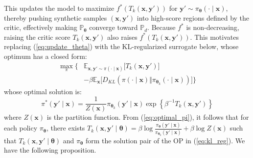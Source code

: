 This updates the model to maximize $f^{*}(T_{k}(\boldsymbol{x},\boldsymbol{y}'))$ for $\boldsymbol{y}' \sim \pi_{\boldsymbol{\theta}}(\cdot \mid \boldsymbol{x})$, thereby pushing synthetic samples $(\boldsymbol{x}, \boldsymbol{y}')$ into high-score regions defined by the critic, effectively making $\mathbb{P}_{\boldsymbol{\theta}}$ converge toward $\mathbb{P}_d$. Because $f^*$ is non-decreasing, raising the critic score $T_k(\boldsymbol{x},\boldsymbol{y}')$ also raises $f^*(T_k(\boldsymbol{x},\boldsymbol{y}'))$. This motivates replacing (\ref{eq:update_theta}) with the KL-regularized surrogate below, whose optimum has a closed form:
\begin{equation}
\label{eq:kl_reg}
\begin{split}
\max_{\pi} \bigg\{ & \mathbb{E}_{\boldsymbol{x},\boldsymbol{y}'\sim\pi(\cdot\mid \boldsymbol{x})} \big[T_{k}(\boldsymbol{x},\boldsymbol{y}')\big] \\
& - \beta\mathbb{E}_{\boldsymbol{x}}\big[D_{KL}(\pi(\cdot\mid \boldsymbol{x}) \Vert \pi_{\boldsymbol{\theta}_{k}}(\cdot\mid \boldsymbol{x}))\big] \bigg\}
\end{split}
\end{equation}
whose optimal solution is:
\begin{equation}
\pi^{*}\left(\boldsymbol{y}'\mid \boldsymbol{x}\right)=\frac{1}{Z\left(\boldsymbol{x}\right)}\pi_{\boldsymbol{\theta}_{k}}\left(\boldsymbol{y}'\mid \boldsymbol{x}\right)\exp\left\{ \beta^{-1}T_{k}\left(\boldsymbol{x},\boldsymbol{y}'\right)\right\}\label{eq:optimal_pi}
\end{equation}
where $Z(\boldsymbol{x})$ is the partition function. From (\ref{eq:optimal_pi}), it follows that for each policy $\pi_{\boldsymbol{\theta}}$, there exists $T_{k}\left(\boldsymbol{x},\boldsymbol{y}' \mid \boldsymbol{\theta} \right)=\beta\log\frac{\pi_{\boldsymbol{\theta}}\left(\boldsymbol{y}'\mid \boldsymbol{x}\right)}{\pi_{\boldsymbol{\theta}_{k}}\left(\boldsymbol{y}'\mid \boldsymbol{x}\right)}+ \beta\log Z\left(\boldsymbol{x}\right)$
such that $T_{k}(\boldsymbol{x},\boldsymbol{y}'\mid\boldsymbol{\theta})$ and $\pi_{\boldsymbol{\theta}}$ form the solution pair of the OP in (\ref{eq:kl_reg}). We have the following proposition.


